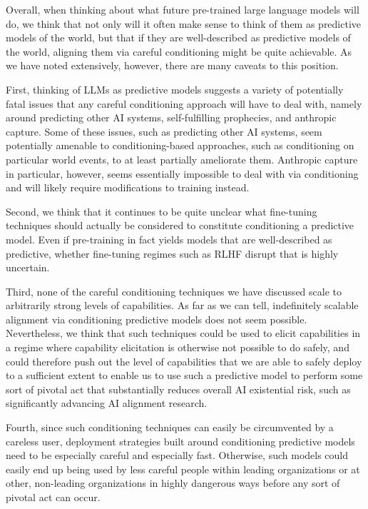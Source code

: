 {{Overall, when thinking about what future pre-trained large language models will do, we think that not only will it often make sense to think of them as predictive models of the world, but that if they are well-described as predictive models of the world, aligning them via careful conditioning might be quite achievable. As we have noted extensively, however, there are many caveats to this position.

First, thinking of LLMs as predictive models suggests a variety of potentially fatal issues that any careful conditioning approach will have to deal with, namely around predicting other AI systems, self-fulfilling prophecies, and anthropic capture. Some of these issues, such as predicting other AI systems, seem potentially amenable to conditioning-based approaches, such as conditioning on particular world events, to at least partially ameliorate them. Anthropic capture in particular, however, seems essentially impossible to deal with via conditioning and will likely require modifications to training instead.

Second, we think that it continues to be quite unclear what fine-tuning techniques should actually be considered to constitute conditioning a predictive model. Even if pre-training in fact yields models that are well-described as predictive, whether fine-tuning regimes such as RLHF disrupt that is highly uncertain.

Third, none of the careful conditioning techniques we have discussed scale to arbitrarily strong levels of capabilities. As far as we can tell, indefinitely scalable alignment via conditioning predictive models does not seem possible. Nevertheless, we think that such techniques could be used to elicit capabilities in a regime where capability elicitation is otherwise not possible to do safely, and could therefore push out the level of capabilities that we are able to safely deploy to a sufficient extent to enable us to use such a predictive model to perform some sort of pivotal act that substantially reduces overall AI existential risk, such as significantly advancing AI alignment research.

Fourth, since such conditioning techniques can easily be circumvented by a careless user, deployment strategies built around conditioning predictive models need to be especially careful and especially fast. Otherwise, such models could easily end up being used by less careful people within leading organizations or at other, non-leading organizations in highly dangerous ways before any sort of pivotal act can occur.

}}
